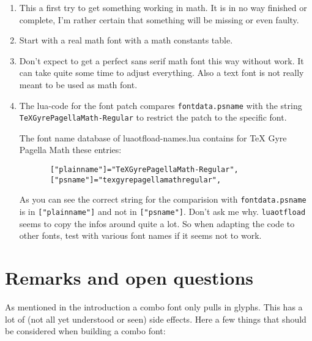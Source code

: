 \documentclass[parskip=half-,egregdoesnotlikesansseriftitles]{scrartcl}
\begin{document}
\begin{enumerate}
\item  This a first try to get something working in math. It is in no way finished or complete, I'm rather certain that something  will be missing or even faulty.
\item  Start with a real math font with a math constants table.
\item  Don't expect to get a perfect sans serif math font this way without work. It can take quite some time to adjust everything. Also a text font is not really meant to be used as math font.
\item  The lua-code for the font patch compares \texttt{fontdata.psname} with the string \\\texttt{TeXGyrePagellaMath-Regular} to restrict the patch to the specific font.

       The font name database of luaotfload-names.lua contains for \textsf{TeX Gyre Pagella Math} these entries:

       \begin{verbatim}
       ["plainname"]="TeXGyrePagellaMath-Regular",
       ["psname"]="texgyrepagellamathregular",
       \end{verbatim}

  As you can see the correct string for the comparision with  \texttt{fontdata.psname}  is in \verb+["plainname"]+ and not in \verb+["psname"]+. Don't ask me why. \texttt{luaotfload} seems to copy the infos around quite a lot. So when adapting the code to other fonts, test with various font names if it seems not to work.
\end{enumerate}


\section{Remarks and open questions}

As mentioned in the introduction a combo font only pulls in glyphs. This has a lot of (not all yet understood or seen) side effects. Here a few things that should be considered when building a combo font:
\end{document}

